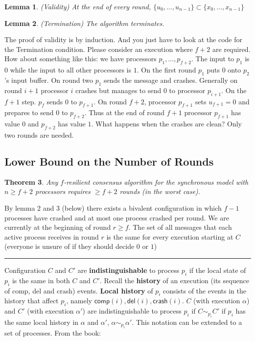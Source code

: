 \documentclass[twoside]{article}
\newcounter{lecnum}
\newtheorem{theorem}{Theorem}[lecnum]
\newtheorem{lemma}[theorem]{Lemma}
\newenvironment{proof}{{\bf Proof:}}{\hfill\rule{2mm}{2mm}}
\newcommand\crash{\mathsf{crash}}
\newcommand\comp{\mathsf{comp}}
\newcommand\del{\mathsf{del}}
\begin{document}
\begin{lemma}
(Validity) At the end of every round,  $\{u_0, ..., u_{n-1}\} \subset \{x_0, ..., x_{n-1}\}$ 
\end{lemma}
\begin{lemma}
(Termination) The algorithm terminates.
\end{lemma}
The proof of validity is by induction. And you just have to look at the code for the Termination condition. Please consider an execution where $f+2$ are required. How about something like this: we have processors $p_1, ..., p_{f+2}$. The input to $p_1$ is $0$ while the input to all other processors is $1$. On the first round $p_1$ puts $0$ onto $p_2$'s input buffer. On round two $p_1$ sends the message and crashes. Generally on round $i+1$ processor $i$ crashes but manages to send $0$ to processor $p_{i+1}$. On the $f + 1$ step. $p_f$ sends $0$ to $p_{f+1}$. On round $f+2$, processor $p_{f+1}$ sets $u_{f+1} = 0$ and prepares to send $0$ to $p_{f+2}$. Thus at the end of round $f+1$ processor $p_{f+1}$ has value $0$ and $p_{f+2}$ has value $1$. What happens when the crashes are clean? Only two rounds are needed.

\subsection{Lower Bound on the Number of Rounds}

\begin{theorem}
Any $f$-resilient consensus algorithm for the synchronous model with $n \geq f + 2$ processors requires $\geq f + 2$ rounds (in the worst case).
\end{theorem}
\begin{proof}
By lemma 2 and 3 (below) there exists a bivalent configuration in which $f-1$ processes have crashed and at most one process crashed per round. We are currently at the beginning of round $r \geq f$. The set of all messages that each active process receives in round $r$ is the same for every execution starting at $C$ (everyone is unsure of if they should decide $0$ or $1$)  
\end{proof}

Configuration $C$ and $C'$ are \textbf{indistinguishable} to process $p_i$ if the local state of $p_i$ is the same in both $C$ and $C'$. Recall the \textbf{history} of an execution (its sequence of comp, del and crash) events. \textbf{Local history} of $p_i$ consists of the events in the history that affect $p_i$, namely $\comp(i), \del(i), \crash(i)$. $C$ (with execution $\alpha$) and $C'$ (with execution $\alpha'$) are indistinguishable to process $p_i$ if $C \sim_{p_i} C'$ if $p_i$ has the same local history in $\alpha$ and $\alpha'$, $\alpha \sim_{p_i} \alpha'$. This notation can be extended to a set of processes. From the book:
\end{document}
